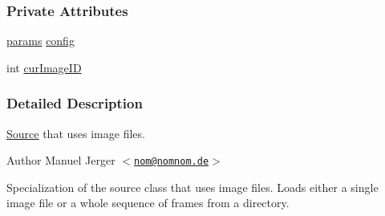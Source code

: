\subsubsection*{\-Private \-Attributes}
\begin{DoxyCompactItemize}
\item 
\hyperlink{structImageSource_1_1params}{params} \hyperlink{classImageSource_adc74dbed687c026e72ad8819d39d0dc1}{config}
\item 
int \hyperlink{classImageSource_a09b0df783173a472d225e0da85c24d22}{cur\-Image\-I\-D}
\end{DoxyCompactItemize}


\subsubsection{\-Detailed \-Description}
\hyperlink{classSource}{\-Source} that uses image files. 

\begin{DoxyAuthor}{\-Author}
\-Manuel \-Jerger $<$\href{mailto:nom@nomnom.de}{\tt nom@nomnom.\-de}$>$
\end{DoxyAuthor}
\-Specialization of the source class that uses image files. \-Loads either a single image file or a whole sequence of frames from a directory. 

